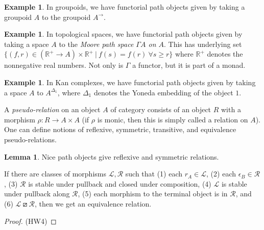 \documentclass{article}
\theoremstyle{definition}
\newtheorem{lemma}[definition]{Lemma}
\newtheorem{example}[definition]{Example}
\begin{document}
\begin{example}
    In groupoids, we have functorial path objects given by taking a groupoid $A$ to the groupoid $A^\to$.
\end{example}

\begin{example}
    In topological spaces, we have functorial path objects given by taking a space $A$ to the \emph{Moore path space $\Gamma A$ on $A$}. This has underlying set $\{ (f, r) \in (\mathbb R^+ \to A ) \times \mathbb R^+ \ | \ f(s) = f(r) \ \forall s \geq r \}$ where $\mathbb R^+$ denotes the nonnegative real numbers. Not only is $\Gamma$ a functor, but it is part of a monad.
\end{example}

\begin{example}
    In Kan complexes, we have functorial path objects given by taking a space $A$ to $A^{\Delta_1}$, where $\Delta_1$ denotes the Yoneda embedding of the object $1$.
\end{example}

A \emph{pseudo-relation} on an object $A$ of category consists of an object $R$ with a morphism $\rho: R \to A \times A$ (if $\rho$ is monic, then this is simply called a relation on $A$). One can define notions of reflexive, symmetric, transitive, and equivalence pseudo-relations.

\begin{lemma}
    \label{lem:equivalence relation}
    Nice path objects give reflexive and symmetric relations.

    If there are classes of morphisms $\mathcal L, \mathcal R$ such that (1) each $r_A \in \mathcal L$, (2) each $\epsilon_B \in \mathcal R$, (3) $\mathcal R$ is stable under pullback and closed under composition, (4) $\mathcal L$ is stable under pullback along $\mathcal R$, (5) each morphism to the terminal object is in $\mathcal R$, and (6) $\mathcal L \boxslash \mathcal R$, then we get an equivalence relation.
\end{lemma}

\begin{proof}
    (HW4)
\end{proof}
\end{document}
